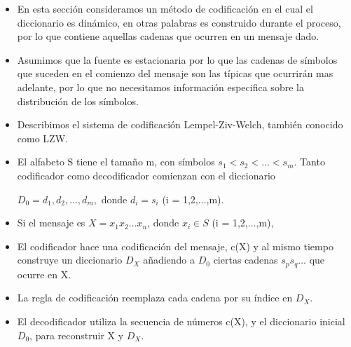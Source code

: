 \documentclass{beamer}
\theoremstyle{plain}
\theoremstyle{example}
\theoremstyle{example}
\begin{document}
\begin{frame}  \small 

\begin{itemize}
\item  En esta sección consideramos un método de codificación en el cual el diccionario es dinámico, en otras palabras es construido durante el proceso, por lo que contiene aquellas cadenas que ocurren en un mensaje dado. 

\item Asumimos que la fuente es estacionaria por lo que las cadenas de símbolos que suceden en el comienzo del mensaje son las típicas que ocurrirán mas adelante, por lo que no necesitamos información especifica sobre la distribución de los símbolos.

\item Describimos el sistema de codificación Lempel-Ziv-Welch, también conocido como LZW.


\end{itemize}


\end{frame} 
\begin{frame}  \small 

\begin{itemize}

\item  El alfabeto S tiene el tamaño m, con símbolos $s_1 < s_2 < \ldots < s_m$. Tanto codificador como decodificador comienzan con el diccionario 

\begin{center}
$D_0 = d_1,d_2, \ldots ,d_m,$	donde $d_i = s_i$ (i = 1,2,$\ldots$,m).
\end{center}

\item Si el mensaje es $X= x_1 x_2 \ldots x_n$, donde $x_i \in S$ (i = 1,2,$\ldots$,m), 

\item El codificador hace una codificación del mensaje, c(X) y al mismo tiempo construye un diccionario $D_X$ añadiendo a $D_0$ ciertas cadenas $s_p s_q \ldots$ que ocurre en X. 

\item La regla de codificación reemplaza cada cadena por su índice en $D_X$. 

\item El decodificador utiliza la secuencia de números c(X), y el diccionario inicial $D_0$, para reconstruir X y $D_X$.
\end{itemize}
\end{frame} 
\end{document}

